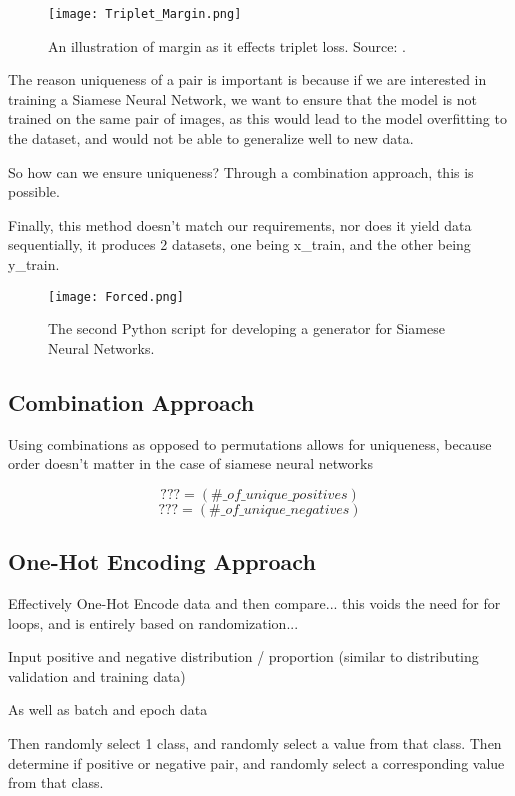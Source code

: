 \documentclass[
	letterpaper, %
	10pt, %
	unnumberedsections, %
	twoside, %
]{LTJournalArticle}
\begin{document}
\begin{figure} %
	\texttt{[image: Triplet\_Margin.png]}
	\caption{An illustration of margin as it effects triplet loss. Source: \autocite{yusuf_sar}.}
	\label{fig:triplet_margin}
\end{figure}

The reason uniqueness of a pair is important is because if we are interested in training a Siamese Neural Network, we want to ensure that the model is not trained on the same pair of images, as this would lead to the model overfitting to the dataset, and would not be able to generalize well to new data.

So how can we ensure uniqueness? Through a combination approach, this is possible.

Finally, this method doesn't match our requirements, nor does it yield data sequentially, it produces 2 datasets, one being x\_train, and the other being y\_train.

\begin{figure*}[hbt!] %
	\centering
    \texttt{[image: Forced.png]}
	\caption{The second Python script for developing a generator for Siamese Neural Networks.}
	\label{fig:forced}
\end{figure*}

\subsection{Combination Approach}

Using combinations as opposed to permutations allows for uniqueness, because order doesn't matter in the case of siamese neural networks

\[ ??? = (\#\_of\_unique\_positives) \]
\[ ??? = (\#\_of\_unique\_negatives) \]

\subsection{One-Hot Encoding Approach}
Effectively One-Hot Encode data and then compare... this voids the need for for loops, and is entirely based on randomization...

Input positive and negative distribution / proportion (similar to distributing validation and training data)

As well as batch and epoch data

Then randomly select 1 class, and randomly select a value from that class. Then determine if positive or negative pair, and randomly select a corresponding value from that class.
\end{document}
